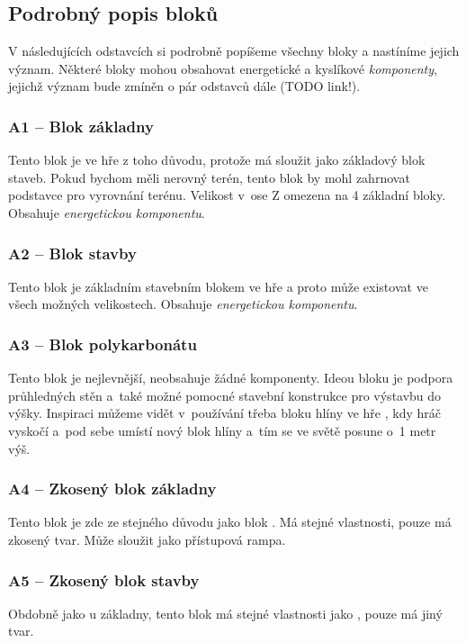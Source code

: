 \FloatBarrier


\subsection{Podrobný popis bloků}

V následujících odstavcích si podrobně popíšeme všechny bloky  a nastíníme jejich význam. Některé bloky mohou obsahovat energetické a kyslíkové \textit{komponenty}, jejichž význam bude zmíněn o pár odstavců dále (TODO link!).



\subsubsection{A1 -- Blok základny}
\label{blocks:A1}
Tento blok je ve hře z toho důvodu, protože má sloužit jako základový blok staveb. Pokud bychom měli nerovný terén, tento blok by mohl zahrnovat podstavce pro vyrovnání terénu. Velikost v~ose Z omezena na 4 základní bloky. Obsahuje \textit{energetickou komponentu}.


\subsubsection{A2 -- Blok stavby}
\label{blocks:A2}
Tento blok je základním stavebním blokem ve hře a proto může existovat ve všech možných velikostech. Obsahuje \textit{energetickou komponentu}.


\subsubsection{A3 -- Blok polykarbonátu}
\label{blocks:A3}
Tento blok je nejlevnější, neobsahuje žádné komponenty. Ideou bloku je podpora průhledných stěn a~také možné pomocné stavební konstrukce pro výstavbu do výšky. Inspiraci můžeme vidět v~používání třeba bloku hlíny ve hře \MC{}, kdy hráč vyskočí a~pod sebe umístí nový blok hlíny a~tím se ve světě posune o~1 metr výš.


\subsubsection{A4 -- Zkosený blok základny}
\label{blocks:A4}
Tento blok je zde ze stejného důvodu jako blok . Má stejné vlastnosti, pouze má zkosený tvar. Může sloužit jako přístupová rampa.


\subsubsection{A5 -- Zkosený blok stavby}
\label{blocks:A5}
Obdobně jako u základny, tento blok má stejné vlastnosti jako , pouze má jiný tvar.


